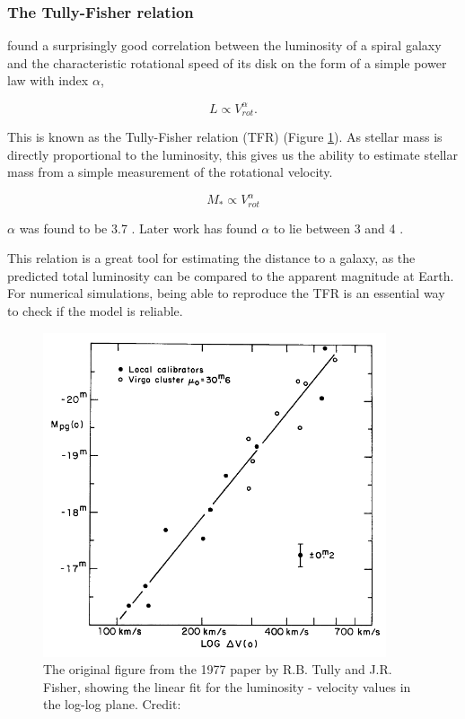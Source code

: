 \subsubsection{The Tully-Fisher relation}

\textcite{TullyFisher1977} found a surprisingly good correlation between the luminosity of a spiral galaxy and the characteristic rotational speed of its disk on the form of a simple power law with index $\alpha$,

\begin{equation}
    L \propto V_{rot}^\alpha.
\end{equation}

This is known as the Tully-Fisher relation (TFR) (Figure \ref{tully_fisher}). As stellar mass is directly proportional to the luminosity, this gives us the ability to estimate stellar mass from a simple measurement of the rotational velocity.

\begin{equation}
    M_* \propto V_{rot}^\alpha 
\end{equation}

$\alpha$ was found to be 3.7 \parencite{TullyFisher1977}. Later work has found $\alpha$ to lie between 3 and 4 \parencite{Lelli2019, Bloom2017}.

This relation is a great tool for estimating the distance to a galaxy, as the predicted total luminosity can be compared to the apparent magnitude at Earth. For numerical simulations, being able to reproduce the TFR is an essential way to check if the model is reliable.

\begin{figure}
    \centering
    \includegraphics[width=0.9\textwidth]{images/tully_fisher.png}
    \caption{The original figure from the 1977 paper by R.B. Tully and J.R. Fisher, showing the linear fit for the luminosity - velocity values in the log-log plane. Credit: \textcite{TullyFisher1977}}
    \label{tully_fisher}
\end{figure}

